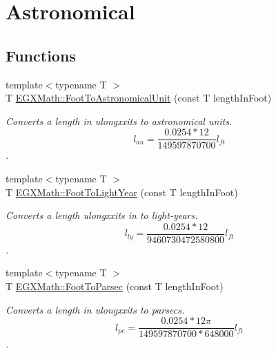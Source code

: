 \hypertarget{group___e_g_x_math-_conversions-_length_conversions-_imperial-_foot-_astronomical}{}\section{Astronomical}
\label{group___e_g_x_math-_conversions-_length_conversions-_imperial-_foot-_astronomical}
\subsection*{Functions}
\begin{DoxyCompactItemize}
\item 
{\footnotesize template$<$typename T $>$ }\\T \mbox{\hyperlink{group___e_g_x_math-_conversions-_length_conversions-_imperial-_foot-_astronomical_ga18d4fb64ab846e864256de77e664033a}{E\+G\+X\+Math\+::\+Foot\+To\+Astronomical\+Unit}} (const T length\+In\+Foot)
\begin{DoxyCompactList}\small\item\em Converts a length in ulongxxits to astronomical units. \[ l_{au}=\frac{0.0254 * 12}{149597870700} l_{ft} \]. \end{DoxyCompactList}\item 
{\footnotesize template$<$typename T $>$ }\\T \mbox{\hyperlink{group___e_g_x_math-_conversions-_length_conversions-_imperial-_foot-_astronomical_gabfbad3d88e53552b7d0ed791c7d75dc7}{E\+G\+X\+Math\+::\+Foot\+To\+Light\+Year}} (const T length\+In\+Foot)
\begin{DoxyCompactList}\small\item\em Converts a length ulongxxits in to light-\/years. \[ l_{ly}=\frac{0.0254 * 12}{9460730472580800} l_{ft} \]. \end{DoxyCompactList}\item 
{\footnotesize template$<$typename T $>$ }\\T \mbox{\hyperlink{group___e_g_x_math-_conversions-_length_conversions-_imperial-_foot-_astronomical_gac6684ac6570b6ec9a0e30237bbb33f16}{E\+G\+X\+Math\+::\+Foot\+To\+Parsec}} (const T length\+In\+Foot)
\begin{DoxyCompactList}\small\item\em Converts a length in ulongxxits to parsecs. \[ l_{pc}=\frac{0.0254 * 12 \pi}{149597870700 * 648000} l_{ft} \]. \end{DoxyCompactList}\end{DoxyCompactItemize}


